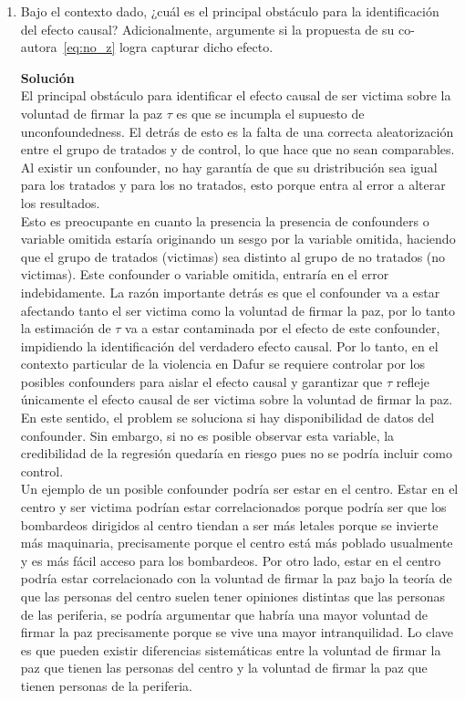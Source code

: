 \documentclass[a4paper, answers, addpoints, 11pt]{exam}
\begin{document}
\begin{enumerate}
    \item Bajo el contexto dado, ¿cuál es el principal obstáculo para la identificación del efecto causal? Adicionalmente, argumente si la propuesta de su co-autora~\eqref{eq:no_z} logra capturar dicho efecto.
    \begin{mdframed}
        \textbf{Solución}\\
        El principal obstáculo para identificar el efecto causal de ser victima sobre la voluntad de firmar la paz $\tau$ es que se incumpla el supuesto de unconfoundedness. El detrás de esto es la falta de una correcta aleatorización entre el grupo de tratados y de control, lo que hace que no sean comparables. Al existir un confounder, no hay garantía de que su dristribución sea igual para los tratados y para los no tratados, esto porque entra al error a alterar los resultados.\\
        
        
        Esto es preocupante en cuanto la presencia la presencia de confounders o variable omitida estaría originando un sesgo por la variable omitida, haciendo que el grupo de tratados (victimas) sea distinto al grupo de no tratados (no victimas). Este confounder o variable omitida, entraría en el error indebidamente. La razón importante detrás es que el confounder va a estar afectando tanto el ser victima como la voluntad de firmar la paz, por lo tanto la estimación de $\tau$ va a estar contaminada por el efecto de este confounder, impidiendo la identificación del verdadero efecto causal. Por lo tanto, en el contexto particular de la violencia en Dafur se requiere controlar por los posibles confounders para aislar el efecto causal y garantizar que $\tau$ refleje únicamente el efecto causal de ser victima sobre la voluntad de firmar la paz.  En este sentido, el problem se soluciona si hay disponibilidad de datos del confounder. Sin embargo, si no es posible observar esta variable, la credibilidad de la regresión quedaría en riesgo pues no se podría incluir como control.\\

        Un ejemplo de un posible confounder podría ser estar en el centro. Estar en el centro y ser victima podrían estar correlacionados porque podría ser que los bombardeos dirigidos al centro tiendan a ser más letales porque se invierte más maquinaria, precisamente porque el centro está más poblado usualmente y es más fácil acceso para los bombardeos. Por otro lado, estar en el centro podría estar correlacionado con la voluntad de firmar la paz bajo la teoría de que las personas del centro suelen tener opiniones distintas que las personas de las periferia, se podría argumentar que habría una mayor voluntad de firmar la paz precisamente porque se vive una mayor intranquilidad. Lo clave es que pueden existir diferencias sistemáticas entre la voluntad de firmar la paz que tienen las personas del centro y la voluntad de firmar la paz que tienen personas de la periferia.\\


\end{mdframed}
\end{enumerate}
\end{document}
